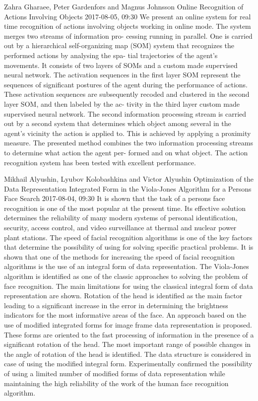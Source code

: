 \documentclass[10pt,fleqn,openany]{book} %
\begin{document}
\begin{enumerate}
		
		\paperabstract
		{Zahra Gharaee, Peter Gardenfors and Magnus Johnsson}
		{Online Recognition of Actions Involving Objects}
		{2017-08-05, 09:30}
		{We present an online system for real time recognition of actions involving objects working in online mode. The system merges two streams of information pro- cessing running in parallel. One is carried out by a hierarchical self-organizing map (SOM) system that recognizes the performed actions by analysing the spa- tial trajectories of the agent's movements. It consists of two layers of SOMs and a custom made supervised neural network. The activation sequences in the first layer SOM represent the sequences of significant postures of the agent during the performance of actions. These activation sequences are subsequently recoded and clustered in the second layer SOM, and then labeled by the ac- tivity in the third layer custom made supervised neural network. The second information processing stream is carried out by a second system that determines which object among several in the agent's vicinity the action is applied to. This is achieved by applying a proximity measure. The presented method combines the two information processing streams to determine what action the agent per- formed and on what object. The action recognition system has been tested with excellent performance.}
		
		
		\paperabstract
		{Mikhail Alyushin, Lyubov Kolobashkina and Victor Alyushin}
		{Optimization of the Data Representation Integrated Form  in the Viola-Jones Algorithm  for a Persons Face Search}
		{2017-08-04, 09:30}
		{It is shown that the task of a persons face recognition is one of the most popular at the present time. Its effective solution determines the reliability of many modern systems of personal identification, security, access control, and video surveillance at thermal and nuclear power plant stations. The speed of facial recognition algorithms is one of the key factors that determine the possibility of using for solving specific practical problems. It is shown that one of the methods for increasing the speed of facial recognition algorithms is the use of an integral form of data representation. The Viola-Jones algorithm is identified as one of the classic approaches to solving the problem of face recognition. The main limitations for using the classical integral form of data representation are shown. Rotation of the head is identified as the main factor leading to a significant increase in the error in determining the brightness indicators for the most informative areas of the face. An approach based on the use of modified integrated forms for image frame data representation is proposed. These forms are oriented to the fast processing of information in the presence of a significant rotation of the head. The most important range of possible changes in the angle of rotation of the head is identified. The data structure is considered in case of using the modified integral form. Experimentally confirmed the possibility of using a limited number of modified forms of data representation while maintaining the high reliability of the work of the human face recognition algorithm.}
		

\end{enumerate}
\end{document}
